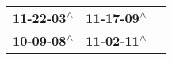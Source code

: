 \begin{supertabular}{lll}
 \textbf{11-22-03\textsuperscript{$\wedge$}} &  \textbf{11-17-09\textsuperscript{$\wedge$}} \\
 \textbf{10-09-08\textsuperscript{$\wedge$}} &  \textbf{11-02-11\textsuperscript{$\wedge$}} \\
\end{supertabular}
